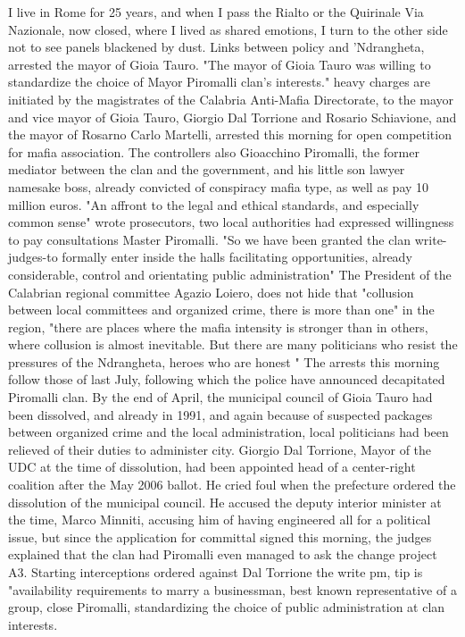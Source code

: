 I live in Rome for 25 years, and when I pass the Rialto or the Quirinale Via Nazionale, now closed, where I lived as shared emotions, I turn to the other side not to see panels blackened by dust.
Links between policy and 'Ndrangheta, arrested the mayor of Gioia Tauro.
"The mayor of Gioia Tauro was willing to standardize the choice of Mayor Piromalli clan's interests."
heavy charges are initiated by the magistrates of the Calabria Anti-Mafia Directorate, to the mayor and vice mayor of Gioia Tauro, Giorgio Dal Torrione and Rosario Schiavione, and the mayor of Rosarno Carlo Martelli, arrested this morning for open competition for mafia association.
The controllers also Gioacchino Piromalli, the former mediator between the clan and the government, and his little son lawyer namesake boss, already convicted of conspiracy mafia type, as well as pay 10 million euros.
"An affront to the legal and ethical standards, and especially common sense" wrote prosecutors, two local authorities had expressed willingness to pay consultations Master Piromalli.
"So we have been granted the clan write-judges-to formally enter inside the halls facilitating opportunities, already considerable, control and orientating public administration"
The President of the Calabrian regional committee Agazio Loiero, does not hide that "collusion between local committees and organized crime, there is more than one" in the region, "there are places where the mafia intensity is stronger than in others, where collusion is almost inevitable.
But there are many politicians who resist the pressures of the Ndrangheta, heroes who are honest "
The arrests this morning follow those of last July, following which the police have announced decapitated Piromalli clan.
By the end of April, the municipal council of Gioia Tauro had been dissolved, and already in 1991, and again because of suspected packages between organized crime and the local administration, local politicians had been relieved of their duties to administer city.
Giorgio Dal Torrione, Mayor of the UDC at the time of dissolution, had been appointed head of a center-right coalition after the May 2006 ballot.
He cried foul when the prefecture ordered the dissolution of the municipal council.
He accused the deputy interior minister at the time, Marco Minniti, accusing him of having engineered all for a political issue, but since the application for committal signed this morning, the judges explained that the clan had Piromalli even managed to ask the change project A3.
Starting interceptions ordered against Dal Torrione the write pm, tip is "availability requirements to marry a businessman, best known representative of a group, close Piromalli, standardizing the choice of public administration at clan interests.
